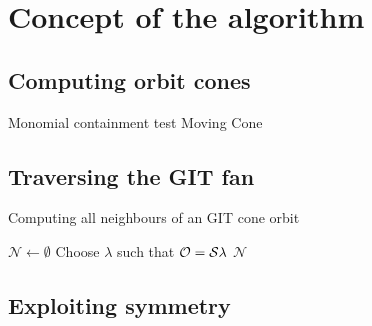 \chapter{Concept of the algorithm}
\label{chap:algorithm}


\label{algorithm:main}

\section{Computing orbit cones}
Monomial containment test
Moving Cone
\section{Traversing the GIT fan}



\begin{algorithm}
	\caption{Computing all neighbours of an GIT cone orbit}
	\label{algo:git_cone_orbitneighbours}
	
	\BlankLine
	$\mathcal{N} \leftarrow \emptyset$\;
	Choose $\lambda$ such that $\mathcal{O} = \mathcal{S}\lambda$\;
	\Return $\mathcal{N}$\;
\end{algorithm}	


\section{Exploiting symmetry}